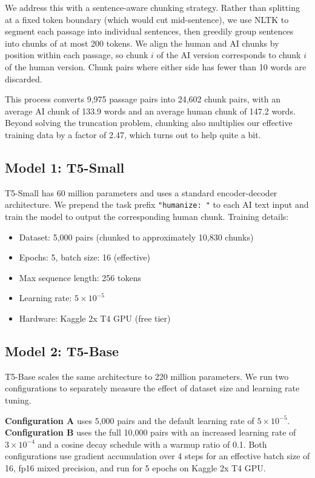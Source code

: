 \documentclass{article}
\begin{document}
We address this with a sentence-aware chunking strategy. Rather than splitting at a fixed token boundary (which would cut mid-sentence), we use NLTK to segment each passage into individual sentences, then greedily group sentences into chunks of at most 200 tokens. We align the human and AI chunks by position within each passage, so chunk $i$ of the AI version corresponds to chunk $i$ of the human version. Chunk pairs where either side has fewer than 10 words are discarded.

This process converts 9,975 passage pairs into 24,602 chunk pairs, with an average AI chunk of 133.9 words and an average human chunk of 147.2 words. Beyond solving the truncation problem, chunking also multiplies our effective training data by a factor of 2.47, which turns out to help quite a bit.

\subsection{Model 1: T5-Small}

T5-Small \cite{raffel2020exploring} has 60 million parameters and uses a standard encoder-decoder architecture. We prepend the task prefix \texttt{"humanize: "} to each AI text input and train the model to output the corresponding human chunk. Training details:

\begin{itemize}[noitemsep]
    \item Dataset: 5,000 pairs (chunked to approximately 10,830 chunks)
    \item Epochs: 5, batch size: 16 (effective)
    \item Max sequence length: 256 tokens
    \item Learning rate: $5 \times 10^{-5}$
    \item Hardware: Kaggle 2x T4 GPU (free tier)
\end{itemize}

\subsection{Model 2: T5-Base}

T5-Base \cite{raffel2020exploring} scales the same architecture to 220 million parameters. We run two configurations to separately measure the effect of dataset size and learning rate tuning.

\textbf{Configuration A} uses 5,000 pairs and the default learning rate of $5 \times 10^{-5}$. \textbf{Configuration B} uses the full 10,000 pairs with an increased learning rate of $3 \times 10^{-4}$ and a cosine decay schedule with a warmup ratio of 0.1. Both configurations use gradient accumulation over 4 steps for an effective batch size of 16, fp16 mixed precision, and run for 5 epochs on Kaggle 2x T4 GPU.
\end{document}
